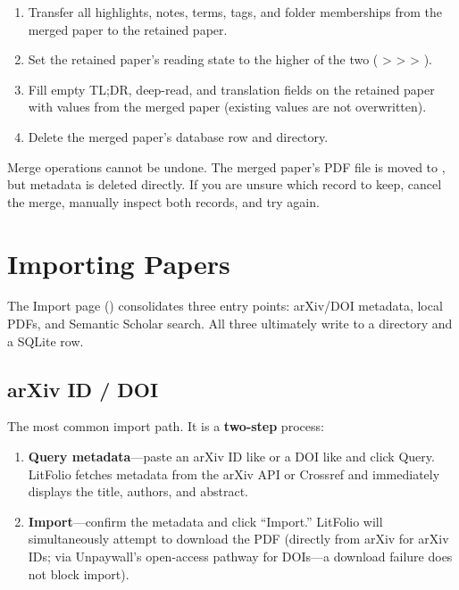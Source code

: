 \begin{enumerate}
  \item Transfer all highlights, notes, terms, tags, and folder memberships from the
    merged paper to the retained paper.
  \item Set the retained paper's reading state to the higher of the two
    ( >  >  > ).
  \item Fill empty TL;DR, deep-read, and translation fields on the retained paper
    with values from the merged paper (existing values are not overwritten).
  \item Delete the merged paper's database row and  directory.
\end{enumerate}

\begin{warnbox}
Merge operations cannot be undone. The merged paper's PDF file is moved to
, but metadata is deleted directly. If you are unsure which
record to keep, cancel the merge, manually inspect both records, and try again.
\end{warnbox}

\chapter{Importing Papers}
\label{ch:import}

The Import page () consolidates three entry points: arXiv/DOI metadata,
local PDFs, and Semantic Scholar search. All three ultimately write to a
 directory and a SQLite row.

\section{arXiv ID / DOI}

The most common import path. It is a \textbf{two-step} process:


\begin{enumerate}
  \item \textbf{Query metadata}---paste an arXiv ID like  or a DOI like
     and click Query. LitFolio fetches metadata from the
    arXiv API or Crossref and immediately displays the title, authors, and abstract.
  \item \textbf{Import}---confirm the metadata and click ``Import.'' LitFolio will
    simultaneously attempt to download the PDF (directly from arXiv for arXiv IDs;
    via Unpaywall's open-access pathway for DOIs---a download failure does not block
    import).
\end{enumerate}

